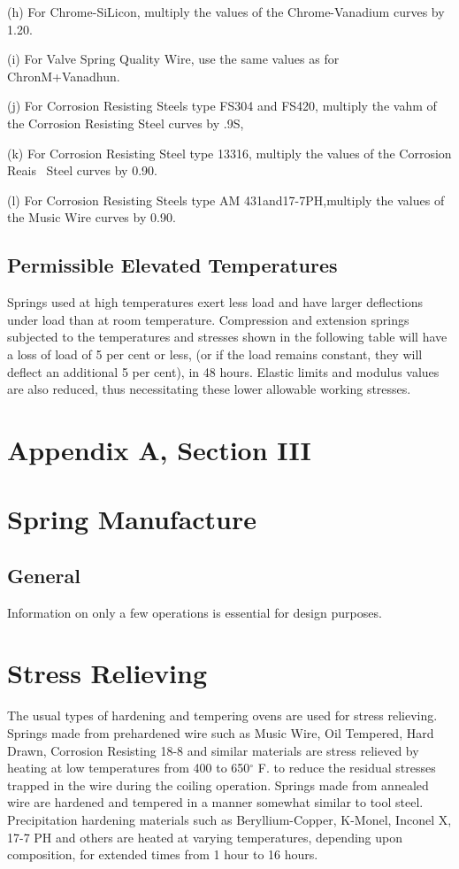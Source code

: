 \documentclass[10pt]{article}
\begin{document}
(h) For Chrome-SiLicon, multiply the values of the Chrome-Vanadium curves by 1.20.

(i) For Valve Spring Quality Wire, use the same values as for ChronM+Vanadhun.

(j) For Corrosion Resisting Steels type FS304 and FS420, multiply the vahm of the Corrosion Resisting Steel curves by .9S,

(k) For Corrosion Resisting Steel type 13316, multiply the values of the Corrosion Reais~ Steel curves by 0.90.

(l) For Corrosion Resisting Steels type AM 431and17-7PH,multiply the values of the Music Wire curves by 0.90.

\subsection{Permissible Elevated Temperatures} %
Springs used at high temperatures exert less load and have larger deflections under load than at room temperature. Compression and extension springs subjected to the temperatures and stresses shown in the following table will have a loss of load of 5 per cent or less, (or if the load remains constant, they will deflect an additional 5 per cent), in 48 hours. Elastic limits and modulus values are also reduced, thus necessitating these lower allowable working stresses.



\clearpage
\setcounter{section}{29} %
\section*{Appendix A, Section III}
\section{Spring Manufacture} %
\subsection{General} %
Information on only a few operations is essential for design purposes.

\section{Stress Relieving} %
The usual types of hardening and tempering ovens are used for stress relieving. 
Springs made from prehardened wire such as Music Wire, Oil Tempered, Hard Drawn, Corrosion Resisting 18-8 and similar materials are stress relieved by heating at low temperatures from 400 to 650$^{\circ}$ F. to reduce the residual stresses trapped in the wire during the coiling operation.
Springs made from annealed wire are hardened and tempered in a manner somewhat similar to tool steel. 
Precipitation hardening materials such as Beryllium-Copper, K-Monel, Inconel X, 17-7 PH and others are heated at varying temperatures, depending upon composition, for extended times from 1 hour to 16 hours.
\end{document}
